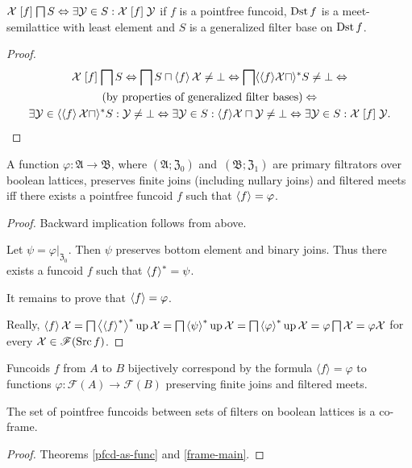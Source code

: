 \begin{prop}
$\mathcal{X}\mathrel{\left[f\right]}\bigsqcap S\Leftrightarrow\exists\mathcal{Y}\in S:\mathcal{X}\mathrel{\left[f\right]}\mathcal{Y}$
if $f$ is a pointfree funcoid, $\operatorname{Dst} f$ is a meet-semilattice with
least element and $S$ is a generalized filter base on $\operatorname{Dst} f$.\end{prop}
\begin{proof}
~
\begin{multline*}
\mathcal{X}\mathrel{\left[f\right]}\bigsqcap S\Leftrightarrow\bigsqcap S\sqcap\left\langle f\right\rangle\mathcal{X}\neq\bot\Leftrightarrow\bigsqcap\langle\langle f\rangle\mathcal{X}\sqcap\rangle^{\ast}S\neq\bot\Leftrightarrow\\
\text{(by properties of generalized filter bases)}\Leftrightarrow\\
\exists\mathcal{Y}\in\langle\left\langle f\right\rangle\mathcal{X}\sqcap\rangle^{\ast}S:\mathcal{Y}\neq\bot\Leftrightarrow\exists\mathcal{Y}\in S:\langle f\rangle\mathcal{X}\sqcap\mathcal{Y}\neq\bot\Leftrightarrow\exists\mathcal{Y}\in S:\mathcal{X}\mathrel{\left[f\right]}\mathcal{Y}.
\end{multline*}
\end{proof}
\begin{thm}
\label{pfcd-as-func}A function $\varphi:\mathfrak{A}\rightarrow\mathfrak{B}$,
where $(\mathfrak{A};\mathfrak{Z}_{0})$ and~$(\mathfrak{B};\mathfrak{Z}_{1})$
are primary filtrators over boolean lattices, preserves finite joins
(including nullary joins) and filtered meets iff there exists a pointfree
funcoid $f$ such that $\left\langle f\right\rangle=\varphi$.\end{thm}
\begin{proof}
Backward implication follows from above.

Let $\psi=\varphi|_{\mathfrak{Z}_{0}}$. Then $\psi$ preserves bottom
element and binary joins. Thus there exists a funcoid $f$ such that
$\left\langle f\right\rangle ^{\ast}=\psi$.

It remains to prove that $\left\langle f\right\rangle=\varphi$.

Really, $\left\langle f\right\rangle\mathcal{X}=\bigsqcap\left\langle \left\langle f\right\rangle ^{\ast}\right\rangle ^{\ast}\operatorname{up}\mathcal{X}=\bigsqcap\left\langle \psi\right\rangle ^{\ast}\operatorname{up}\mathcal{X}=\bigsqcap\left\langle \varphi\right\rangle ^{\ast}\operatorname{up}\mathcal{X}=\varphi\bigsqcap\mathcal{X}=\varphi\mathcal{X}$
for every $\mathcal{X}\in\mathscr{F}(\operatorname{Src} f)$.\end{proof}
\begin{cor}
Funcoids $f$ from $A$ to $B$ bijectively correspond by the formula
$\langle f\rangle=\varphi$ to functions $\varphi:\mathscr{F}(A)\rightarrow\mathscr{F}(B)$
preserving finite joins and filtered meets.\end{cor}
\begin{thm}
The set of pointfree funcoids between sets of filters on boolean
lattices is a co-frame.\end{thm}
\begin{proof}
Theorems \ref{pfcd-as-func} and \ref{frame-main}.
\end{proof}

